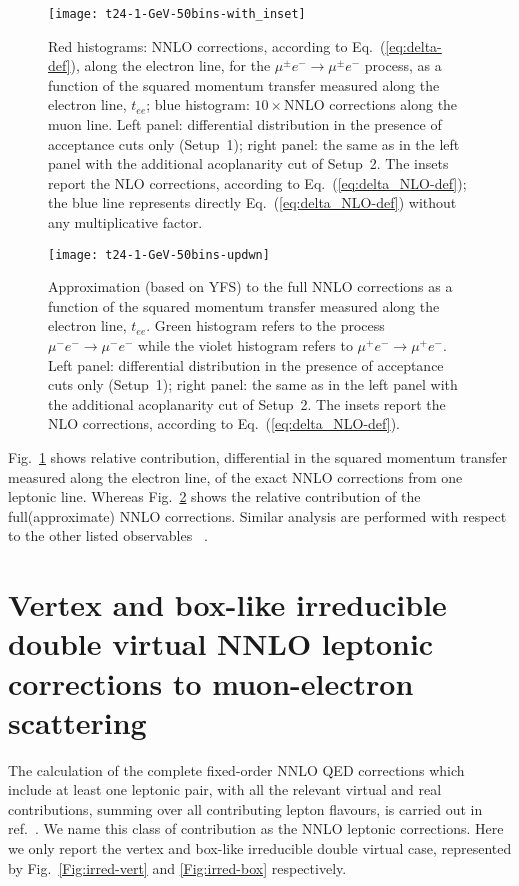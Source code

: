 \documentclass[Physsubmission, Phys]{SciPost}
\begin{document}
\begin{figure}[t]
\begin{center}
\texttt{[image: t24-1-GeV-50bins-with\_inset]}
\end{center}
\caption{\label{Fig:t24-0-1} Red histograms: NNLO corrections, 
  according to Eq.~(\ref{eq:delta-def}), along the electron line,
  for the $\mu^\pm e^- \to \mu^\pm e^- $ process, as a function of
  the squared momentum transfer measured along the electron line, $t_{ee}$;
  blue histogram: $10\times$NNLO corrections along the muon line. 
  Left panel: differential distribution in the presence of acceptance cuts
  only (Setup~1); right panel: the same as in the left panel with
  the additional acoplanarity cut of Setup~2.
  The insets report the NLO corrections,
  according to Eq.~(\ref{eq:delta_NLO-def}); the blue line represents
  directly Eq.~(\ref{eq:delta_NLO-def}) without any multiplicative factor.}
\end{figure}

\begin{figure}[t]
\begin{center}
\texttt{[image: t24-1-GeV-50bins-updwn]}
\end{center}
\caption{\label{Fig:t24-int} Approximation (based on YFS) to the full NNLO corrections 
  as a function of the squared momentum transfer measured along the electron line, $t_{ee}$.
  Green histogram refers to the process $\mu^- e^- \to \mu^- e^- $ while 
  the violet histogram refers to $\mu^+ e^- \to \mu^+ e^- $. 
  Left panel: differential distribution in the presence of acceptance cuts
  only (Setup~1); right panel: the same as in the left panel
  with the additional acoplanarity cut of Setup~2.
  The insets report the NLO corrections, according to
  Eq.~(\ref{eq:delta_NLO-def}).}
\end{figure}


Fig.~\ref{Fig:t24-0-1} shows relative contribution, differential in the squared momentum
         transfer measured along the electron line, of the exact NNLO corrections from one leptonic line. Whereas Fig.~\ref{Fig:t24-int} shows the relative contribution of the full(approximate) NNLO corrections. Similar analysis are performed with respect to the other listed observables ~\cite{CarloniCalame:2020yoz}.  

\section{Vertex and box-like irreducible double virtual NNLO leptonic corrections to muon-electron scattering}
The calculation of the complete fixed-order
NNLO QED corrections which include at least one leptonic pair, with
all the relevant virtual and real contributions, summing over all
contributing lepton flavours, is carried out in ref.~\cite{Budassi:2021twh}. We name this class of contribution as the NNLO leptonic corrections. Here we only report the vertex and box-like irreducible double virtual case, represented by Fig.~\ref{Fig:irred-vert} and \ref{Fig:irred-box} respectively. 
\end{document}
